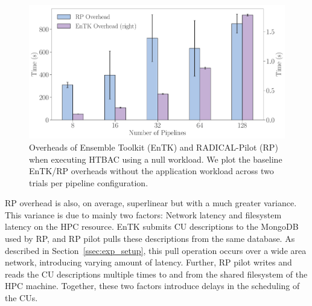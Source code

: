 
\begin{figure}
  \centering
  \includegraphics[width=\columnwidth]{FIGURES/null_workload_overheads.pdf}
  \caption{Overheads of Ensemble Toolkit (EnTK) and RADICAL-Pilot (RP) when
           executing HTBAC using a null workload. We plot the baseline
           EnTK/RP overheads without the application workload across two
           trials per pipeline configuration.}\label{fig:exp1}
\end{figure}


RP overhead is also, on average, superlinear but with a much greater
variance. This variance is due to mainly two factors: Network latency and
filesystem latency on the HPC resource. EnTK submits CU descriptions to the
MongoDB used by RP, and RP pilot pulls these descriptions from the same
database. As described in Section~\ref{ssec:exp_setup}, this pull operation
occurs over a wide area network, introducing varying amount of latency.
Further, RP pilot writes and reads the CU descriptions multiple times to
and from the shared filesystem of the HPC machine. Together, these two
factors introduce delays in the scheduling of the CUs.


